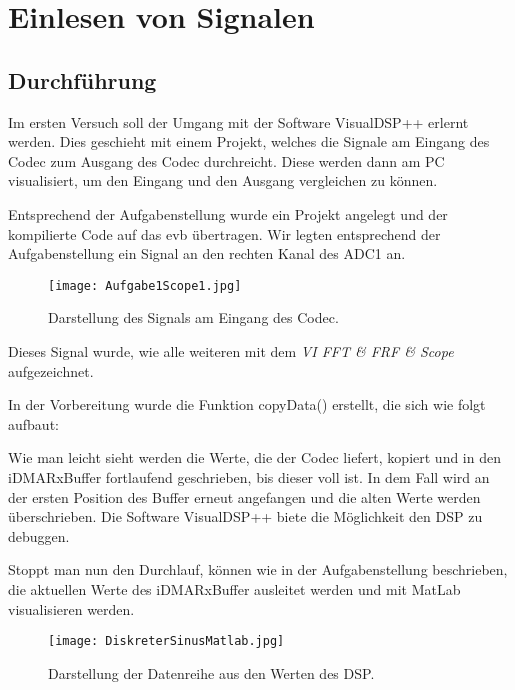 \chapter{Einlesen von Signalen}
\section{Durchführung}
Im ersten Versuch soll der Umgang mit der Software VisualDSP++ erlernt werden. 
Dies geschieht mit einem Projekt, welches die Signale am Eingang des Codec zum 
Ausgang des Codec durchreicht. Diese werden dann am PC visualisiert, um den Eingang und den Ausgang vergleichen zu können.\\\par 

Entsprechend der Aufgabenstellung wurde ein Projekt angelegt und der kompilierte Code auf das \gls{evb} übertragen. 
Wir legten entsprechend der Aufgabenstellung ein Signal an den rechten Kanal des ADC1 an. 


\begin{figure}[bp!]
  \centering
    \texttt{[image: Aufgabe1Scope1.jpg]}
  \caption{Darstellung des Signals am Eingang des Codec.}
  \label{fig:SinusFunktionsGen}
\end{figure}


Dieses Signal wurde, wie alle weiteren mit dem \textit{VI FFT \& FRF \& Scope} 
aufgezeichnet.\pagebreak

In der Vorbereitung wurde die Funktion copyData() erstellt, die sich wie folgt 
aufbaut:
\begin{adjustbox}{width=\textwidth,keepaspectratio}

\end{adjustbox}

Wie man leicht sieht werden die Werte, die der Codec liefert, kopiert und in den iDMARxBuffer 
fortlaufend geschrieben, bis dieser voll ist. 
In dem Fall wird an der ersten Position des Buffer erneut angefangen und die alten Werte werden überschrieben.
Die Software VisualDSP++ biete die Möglichkeit den DSP zu debuggen.\pagebreak


Stoppt man nun den Durchlauf, können wie in der Aufgabenstellung beschrieben, 
die aktuellen Werte des iDMARxBuffer ausleitet werden und mit MatLab visualisieren werden. 
\begin{figure}[!htb]
  \centerline{
    \texttt{[image: DiskreterSinusMatlab.jpg]}}
      \caption{Darstellung der Datenreihe aus den Werten des DSP.}
      \label{fig:SinusMatlab}
\end{figure}




